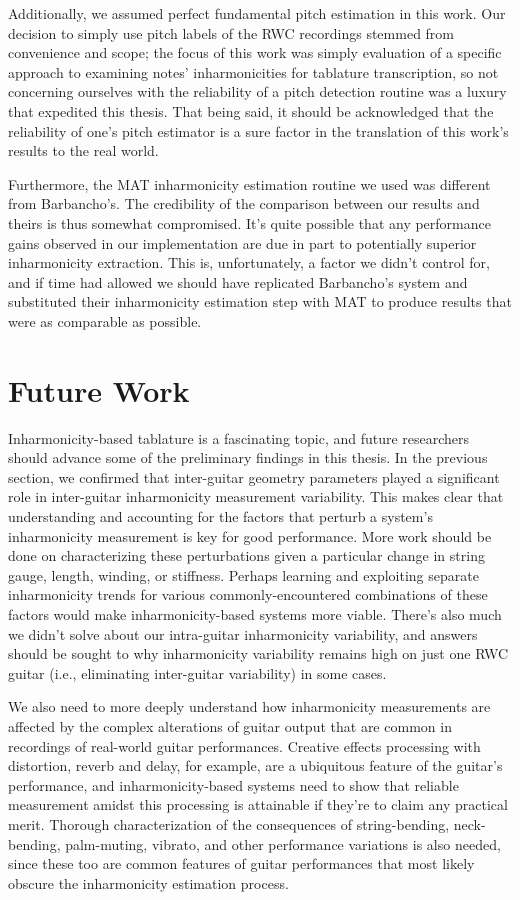 \documentclass[12pt]{cmuthesis}
\begin{document}
Additionally, we assumed perfect fundamental pitch estimation in this work. Our decision to simply use pitch labels of the RWC recordings stemmed from convenience and scope; the focus of this work was simply evaluation of a specific approach to examining notes' inharmonicities for tablature transcription, so not concerning ourselves with the reliability of a pitch detection routine was a luxury that expedited this thesis. That being said, it should be acknowledged that the reliability of one's pitch estimator is a sure factor in the translation of this work's results to the real world.

Furthermore, the MAT inharmonicity estimation routine we used was different from Barbancho's. The credibility of the comparison between our results and theirs is thus somewhat compromised. It's quite possible that any performance gains observed in our implementation are due in part to potentially superior inharmonicity extraction. This is, unfortunately, a factor we didn't control for, and if time had allowed we should have replicated Barbancho's system and substituted their inharmonicity estimation step with MAT to produce results that were as comparable as possible.

\section{Future Work}
Inharmonicity-based tablature is a fascinating topic, and future researchers should advance some of the preliminary findings in this thesis. In the previous section, we confirmed that inter-guitar geometry parameters played a significant role in inter-guitar inharmonicity measurement variability. This makes clear that understanding and accounting for the factors that perturb a system's inharmonicity measurement is key for good performance. More work should be done on characterizing these perturbations given a particular change in string gauge, length, winding, or stiffness. Perhaps learning and exploiting separate inharmonicity trends for various commonly-encountered combinations of these factors would make inharmonicity-based systems more viable. There's also much we didn't solve about our intra-guitar inharmonicity variability, and answers should be sought to why inharmonicity variability remains high on just one RWC guitar (i.e., eliminating inter-guitar variability) in some cases.

We also need to more deeply understand how inharmonicity measurements are affected by the complex alterations of guitar output that are common in recordings of real-world guitar performances. Creative effects processing with distortion, reverb and delay, for example, are a ubiquitous feature of the guitar's performance, and inharmonicity-based systems need to show that reliable measurement amidst this processing is attainable if they're to claim any practical merit. Thorough characterization of the consequences of string-bending, neck-bending, palm-muting, vibrato, and other performance variations is also needed, since these too are common features of guitar performances that most likely obscure the inharmonicity estimation process.
\end{document}
